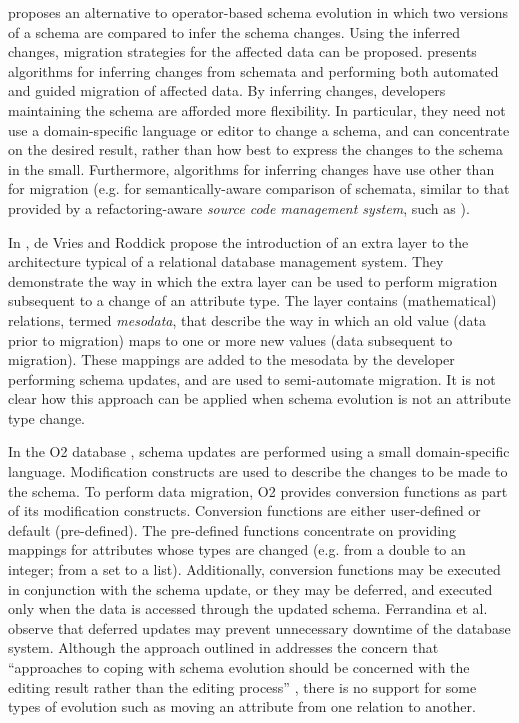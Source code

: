 \cite{lerner00model} proposes an alternative to operator-based schema evolution in which two versions of a schema are compared to infer the schema changes. Using the inferred changes, migration strategies for the affected data can be proposed. \cite{lerner00model} presents algorithms for inferring changes from schemata and performing both automated and guided migration of affected data. By inferring changes, developers maintaining the schema are afforded more flexibility. In particular, they need not use a domain-specific language or editor to change a schema, and can concentrate on the desired result, rather than how best to express the changes to the schema in the small. Furthermore, algorithms for inferring changes have use other than for migration (e.g. for semantically-aware comparison of schemata, similar to that provided by a refactoring-aware \textit{source code management system}, such as \cite{dig07cms}).

In \cite{vries04facilitating}, de Vries and Roddick propose the introduction of an extra layer to the architecture typical of a relational database management system. They demonstrate the way in which the extra layer can be used to perform migration subsequent to a change of an attribute type. The layer contains (mathematical) relations, termed \textit{mesodata}, that describe the way in which an old value (data prior to migration) maps to one or more new values (data subsequent to migration). These mappings are added to the mesodata by the developer performing schema updates, and are used to semi-automate migration. It is not clear how this approach can be applied when schema evolution is not an attribute type change.

In the O2 database \cite{ferrandina95schema}, schema updates are performed using a small domain-specific language. Modification constructs are used to describe the changes to be made to the schema. To perform data migration, O2 provides conversion functions as part of its modification constructs. Conversion functions are either user-defined or default (pre-defined). The pre-defined functions concentrate on providing mappings for attributes whose types are changed (e.g. from a double to an integer; from a set to a list). Additionally, conversion functions may be executed in conjunction with the schema update, or they may be deferred, and executed only when the data is accessed through the updated schema. Ferrandina et al. observe that deferred updates may prevent unnecessary downtime of the database system. Although the approach outlined in \cite{ferrandina95schema} addresses the concern that ``approaches to coping with schema evolution should be concerned with the editing result rather than the editing process'' \cite{lerner00model}, there is no support for some types of evolution such as moving an attribute from one relation to another.


